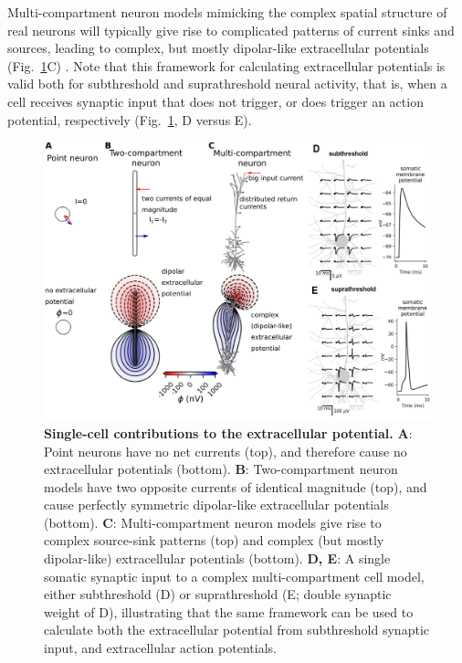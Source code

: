 \documentclass[preprint,11pt,authoryear]{elsarticle}
\begin{document}
Multi-compartment neuron models mimicking the complex spatial structure of real neurons will typically give rise to complicated patterns of current sinks and sources, leading to complex, but mostly dipolar-like extracellular potentials (Fig.~\ref{fig:EP_morph}C) \citep{Einevoll2013}.
Note that this framework for calculating extracellular potentials is valid both for subthreshold and suprathreshold neural activity, that is, when a cell receives synaptic input that does not trigger, or does trigger an action potential, respectively (Fig.~\ref{fig:EP_morph}, D versus E).

\begin{figure}[!ht]
\begin{center}
\includegraphics[width=1\textwidth]{single_cell_EP}
\end{center}
\caption{\textbf{Single-cell contributions to the extracellular potential.} 
{\bf A}: Point neurons have no net currents (top), and therefore cause no extracellular potentials (bottom). 
{\bf B}: Two-compartment neuron models have two opposite currents
of identical magnitude (top), and cause perfectly symmetric dipolar-like extracellular potentials (bottom). 
{\bf C}: Multi-compartment neuron models \citep{Hay2011} give rise to complex source-sink patterns (top) and complex (but mostly dipolar-like) extracellular potentials (bottom). 
{\bf D, E}: A single somatic synaptic input to a complex multi-compartment cell model, either subthreshold (D) or suprathreshold (E; double synaptic weight of D), illustrating that the same framework can be used to calculate both the extracellular potential from subthreshold synaptic input, and extracellular action potentials. 
}
\label{fig:EP_morph}
\end{figure}
\end{document}
